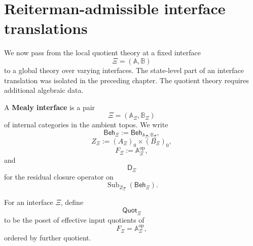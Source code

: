 \section{Reiterman-admissible interface translations}
\label{sec:reiterman-admissible-interface-translations}

We now pass from the local quotient theory at a fixed interface
\[
\Xi=(\mathbb A,\mathbb B)
\]
to a global theory over varying interfaces. The state-level part of an
interface translation was isolated in the preceding chapter. The quotient
theory requires additional algebraic data.

\begin{definition}
\label{def:reiterman-mealy-interface}
A \textbf{Mealy interface} is a pair
\[
\Xi=(\mathbb A_\Xi,\mathbb B_\Xi)
\]
of internal categories in the ambient topos. We write
\[
\mathsf{Beh}_\Xi
:=
\mathsf{Beh}_{\mathbb A_\Xi,\mathbb B_\Xi},
\]
\[
Z_\Xi:=
(A_\Xi)_0\times(B_\Xi)_0,
\]
\[
F_\Xi:=\mathbb A_\Xi^{\mathrm{op}},
\]
and
\[
\mathsf D_\Xi
\]
for the residual closure operator on
\[
\operatorname{Sub}_{Z_\Xi}(\mathsf{Beh}_\Xi).
\]
\end{definition}

\begin{definition}
\label{def:reiterman-effective-quotient-poset-interface}
For an interface \(\Xi\), define
\[
\mathsf{Quot}_\Xi
\]
to be the poset of effective input quotients of
\[
F_\Xi=\mathbb A_\Xi^{\mathrm{op}},
\]
ordered by further quotient.
\end{definition}

